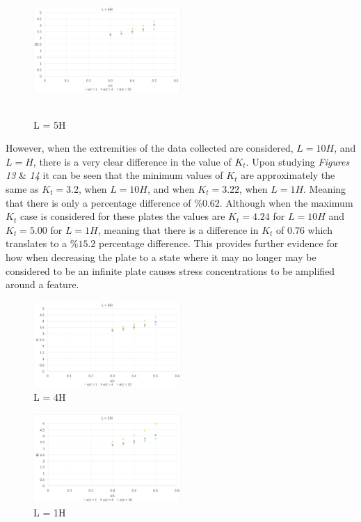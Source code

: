 \documentclass[11pt,twocolumn]{article} %
\begin{document}
\begin{figure}[!ht]
    	\includegraphics[height=5cm,width=0.5\textwidth]{L5.png}
    	\caption{L = 5H}
\end{figure}
\linebreak\linebreak
However, when the extremities of the data collected are considered, $L=10H$, and $L=H$, there is a very clear difference in the value of $K_{t}$. Upon studying \textit{Figures 13} \& \textit{14} it can be seen that the minimum values of $K_{t}$ are approximately the same as $K_{t} = 3.2$, when $L=10H$, and when $K_{t}= 3.22$, when $L=1H$. Meaning that there is only a percentage difference of $\%0.62$. Although when the maximum $K_{t}$ case is considered for these plates the values are $K_{t}=4.24$ for $L=10H$ and $K_{t}=5.00$ for $L=1H$, meaning that there is a difference in $K_{t}$ of $0.76$ which translates to a $\%15.2$ percentage difference. This provides further evidence for how when decreasing the plate to a state where it may no longer may be considered to be an infinite plate causes stress concentrations to be amplified around a feature.  
\begin{figure}[!ht]
    	\includegraphics[width=0.5\textwidth]{L4.png}
    	\caption{L = 4H}
\end{figure}
\begin{figure}[!ht]
    	\includegraphics[width=0.5\textwidth]{L1.png}
    	\caption{L = 1H}
\end{figure}
\end{document}
